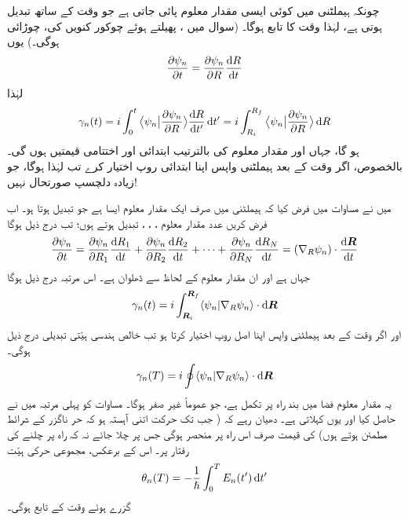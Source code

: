  چونکہ ہیملٹنی میں کوئی ایسی مقدار معلوم  پائی جاتی ہے جو وقت کے ساتھ تبدیل ہوتی ہے، لہٰذا  وقت  کا تابع ہوگا۔ (سوال  میں ، پھیلتے ہوئے چوکور کنویں کی، چوڑائی ہوگی۔) یوں
\begin{align}\label{مساوات_حر_ایک_مقدار_معلوم}
\frac{\partial \psi_n}{\partial t} = \frac{\partial \psi_n}{\partial R} \frac{\dif R}{\dif t}
\end{align}
لہٰذا 
\begin{align}\label{مساوات_حر_ہندسی_ہیّت_فرق}
\gamma_n (t) = i \int_0^t \big\langle \psi_n \big| \frac{\partial \psi_n}{\partial R} \big\rangle \frac{\dif R}{\dif t'} \dif t' = i \int_{R_i}^{R_f} \big\langle \psi_n \big | \frac{\partial \psi_n}{\partial R}\big \rangle \dif R 
\end{align}
ہو گا، جہاں  اور  مقدار معلوم  کی بالترتیب ابتدائی اور اختتامی قیمتیں ہوں گی۔ بالخصوص، اگر وقت  کے بعد ہیملٹنی واپس اپنا ابتدائی روپ اختیار کرے تب  لہٰذا  ہوگا، جو زیادہ دلچسپ صورتحال نہیں!

 میں نے مساوات  میں فرض کیا کہ ہیملٹنی میں صرف ایک مقدار معلوم ایسا ہے جو تبدیل ہوتا ہو۔ اب فرض کریں  عدد مقدار معلوم ، ، ،  تبدیل ہوتے ہوں؛ تب درج ذیل ہوگا 
\begin{align}
\frac{\partial \psi_n}{\partial t} = \frac{\partial \psi_n}{\partial R_1} \frac{\dif R_1}{\dif t} + \frac{\partial \psi_n}{\partial R_2} \frac{\dif R_2}{\dif t} + \cdots + \frac{\partial \psi_n}{\partial R_N} \frac{\dif R_N}{\dif t} = (\nabla_R \psi_n) \cdot \frac{\dif \kvec{R}}{\dif t}
\end{align} 
جہاں  ہے اور  ان مقدار معلوم کے لحاظ سے ڈھلوان ہے۔ اس مرتبہ درج ذیل ہوگا 
\begin{align}
\gamma_n (t) = i \int_{\kvec{R}_i}^{\kvec{R}_f} \langle \psi_n | \nabla_R \psi_n \rangle \cdot \dif \kvec{R}
\end{align}
اور اگر وقت  کے بعد ہیملٹنی واپس اپنا اصل روپ اختیار کرتا ہو تب خالص ہندسی ہیّتی تبدیلی درج ذیل ہوگی۔
\begin{align}\label{مساوات_حر_غیر_صفر_لکیری_تکمل}
\gamma_n (T) = i \oint \langle \psi_n | \nabla_R \psi_n \rangle \cdot \dif \kvec{R}
\end{align}
یہ مقدار معلوم فضا میں بند راہ پر  تکمل ہے، جو عموماً غیر صفر ہوگا۔ مساوات  کو پہلی مرتبہ  میں  نے حاصل کیا اور یوں   کہلاتی ہے۔ دھیان رہے کہ ( جب تک حرکت اتنی آہستہ ہو کہ حر ناگزر کے شرائط مطمئن ہوتے ہوں)  کی قیمت صرف اس راہ پر منحصر ہوگی جس پر چلا جائے نہ کہ راہ پر چلنے کی رفتار پر۔ اس کے برعکس، مجموعی حرکی ہیّت 
\begin{align*}
\theta_n (T) = - \frac{1}{\hslash} \int_0^T E_n (t') \dif t'
\end{align*}
گزرے ہوئے وقت کے تابع ہوگی۔

